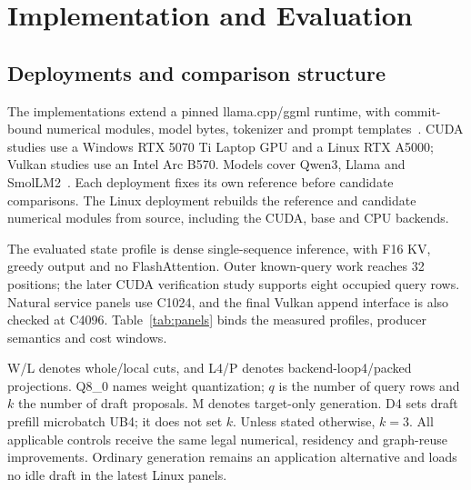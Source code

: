 \section{Implementation and Evaluation}
\label{sec:eval}
\subsection{Deployments and comparison structure}
The implementations extend a pinned llama.cpp/ggml runtime, with commit-bound numerical modules, model bytes, tokenizer and prompt templates~\cite{records}. CUDA studies use a Windows RTX 5070 Ti Laptop GPU and a Linux RTX A5000; Vulkan studies use an Intel Arc B570. Models cover Qwen3, Llama and SmolLM2~\cite{qwen3,llama3,smol}. Each deployment fixes its own reference before candidate comparisons. The Linux deployment rebuilds the reference and candidate numerical modules from source, including the CUDA, base and CPU backends.

The evaluated state profile is dense single-sequence inference, with F16 KV, greedy output and no FlashAttention. Outer known-query work reaches 32 positions; the later CUDA verification study supports eight occupied query rows. Natural service panels use C1024, and the final Vulkan append interface is also checked at C4096. Table~\ref{tab:panels} binds the measured profiles, producer semantics and cost windows.

W/L denotes whole/local cuts, and L4/P denotes backend-loop4/packed projections. Q8\_0 names weight quantization; $q$ is the number of query rows and $k$ the number of draft proposals. M denotes target-only generation. D4 sets draft prefill microbatch UB4; it does not set $k$. Unless stated otherwise, $k=3$. All applicable controls receive the same legal numerical, residency and graph-reuse improvements. Ordinary generation remains an application alternative and loads no idle draft in the latest Linux panels.

